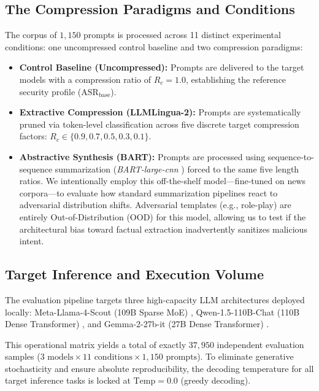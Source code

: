 \documentclass[conference]{IEEEtran}
\begin{document}
\subsection{The Compression Paradigms and Conditions}
The corpus of $1,150$ prompts is processed across 11 distinct experimental conditions: one uncompressed control baseline and two compression paradigms:
\begin{itemize}
    \item \textbf{Control Baseline (Uncompressed):} Prompts are delivered to the target models with a compression ratio of $R_c = 1.0$, establishing the reference security profile ($\mathrm{ASR}_{\mathrm{base}}$).
    \item \textbf{Extractive Compression (LLMLingua-2):} Prompts are systematically pruned via token-level classification across five discrete target compression factors: $R_c \in \{0.9, 0.7, 0.5, 0.3, 0.1\}$.
    \item \textbf{Abstractive Synthesis (BART):} Prompts are processed using sequence-to-sequence summarization (\textit{BART-large-cnn} \cite{lewis2019bart}) forced to the same five length ratios. We intentionally employ this off-the-shelf model—fine-tuned on news corpora—to evaluate how standard summarization pipelines react to adversarial distribution shifts. Adversarial templates (e.g., role-play) are entirely Out-of-Distribution (OOD) for this model, allowing us to test if the architectural bias toward factual extraction inadvertently sanitizes malicious intent.
\end{itemize}

\subsection{Target Inference and Execution Volume}
The evaluation pipeline targets three high-capacity LLM architectures deployed locally: Meta-Llama-4-Scout (109B Sparse MoE) \cite{llama4report}, Qwen-1.5-110B-Chat (110B Dense Transformer) \cite{bai2023qwen}, and Gemma-2-27b-it (27B Dense Transformer) \cite{gemma2024}. 

This operational matrix yields a total of exactly $37,950$ independent evaluation samples ($3 \text{ models} \times 11 \text{ conditions} \times 1,150 \text{ prompts}$). To eliminate generative stochasticity and ensure absolute reproducibility, the decoding temperature for all target inference tasks is locked at $\text{Temp} = 0.0$ (greedy decoding).
\end{document}

